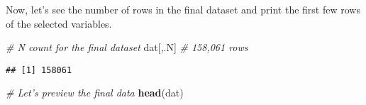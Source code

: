 \documentclass[]{book}
\newenvironment{Shaded}{\begin{snugshade}}{\end{snugshade}}
\newcommand{\CommentTok}[1]{\textcolor[rgb]{0.56,0.35,0.01}{\textit{#1}}}
\newcommand{\ControlFlowTok}[1]{\textcolor[rgb]{0.13,0.29,0.53}{\textbf{#1}}}
\newcommand{\KeywordTok}[1]{\textcolor[rgb]{0.13,0.29,0.53}{\textbf{#1}}}
\newcommand{\NormalTok}[1]{#1}
\newcommand{\OperatorTok}[1]{\textcolor[rgb]{0.81,0.36,0.00}{\textbf{#1}}}
\newcommand{\StringTok}[1]{\textcolor[rgb]{0.31,0.60,0.02}{#1}}
\begin{document}
\begin{Shaded}
\begin{Highlighting}[]
{{{    \ControlFlowTok{else} \ControlFlowTok{if}\NormalTok{ (x }\OperatorTok{%in%}\StringTok{ }\KeywordTok{c}\NormalTok{(}\StringTok{"Germany"}\NormalTok{, }\StringTok{"Italy"}\NormalTok{, }\StringTok{"France"}\NormalTok{)) }\StringTok{"Europe"}
    \ControlFlowTok{else} \ControlFlowTok{if}\NormalTok{ (x }\OperatorTok{%in%}\StringTok{ }\KeywordTok{c}\NormalTok{(}\StringTok{"Australia"}\NormalTok{, }\StringTok{"New Zealand"}\NormalTok{)) }\StringTok{"Australia"}
    \ControlFlowTok{else} \ControlFlowTok{if}\NormalTok{ (x }\OperatorTok{%in%}\StringTok{ }\KeywordTok{c}\NormalTok{(}\StringTok{"Israel"}\NormalTok{, }\StringTok{"Jordan"}\NormalTok{, }\StringTok{"Lebanon"}\NormalTok{)) }\StringTok{"Middle-East"}
\NormalTok{    \}))}
\NormalTok{  )]}
\end{Highlighting}
\end{Shaded}

Now, let's see the number of rows in the final dataset and print the first few rows of the selected variables.

\begin{Shaded}
\begin{Highlighting}[]
\CommentTok{# N count for the final dataset}
\NormalTok{dat[,.N] }\CommentTok{# 158,061 rows}
\end{Highlighting}
\end{Shaded}

\begin{verbatim}
## [1] 158061
\end{verbatim}

\begin{Shaded}
\begin{Highlighting}[]
\CommentTok{# Let's preview the final data}
\KeywordTok{head}\NormalTok{(dat)}
\end{Highlighting}
\end{Shaded}
\end{document}
